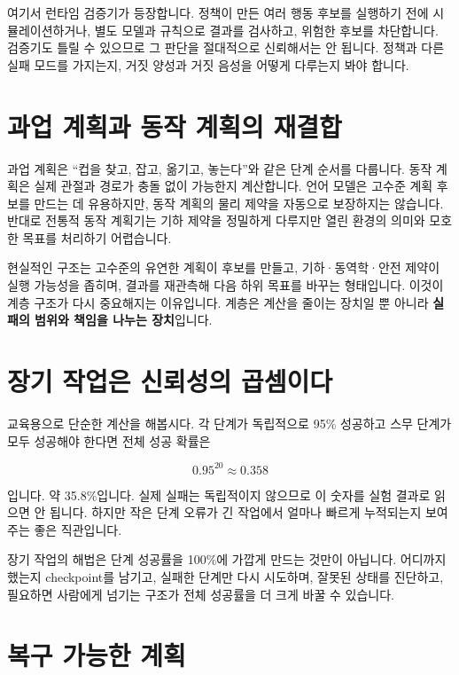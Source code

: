 \documentclass[11pt,openany]{book}
\newcommand{\keyterm}[1]{{\sffamily\bfseries\color{deepblue}#1}}
\begin{document}
여기서 런타임 검증기가 등장합니다. 정책이 만든 여러 행동 후보를 실행하기 전에 시뮬레이션하거나, 별도 모델과 규칙으로 결과를 검사하고, 위험한 후보를 차단합니다. 검증기도 틀릴 수 있으므로 그 판단을 절대적으로 신뢰해서는 안 됩니다. 정책과 다른 실패 모드를 가지는지, 거짓 양성과 거짓 음성을 어떻게 다루는지 봐야 합니다.

\section{과업 계획과 동작 계획의 재결합}

과업 계획은 ``컵을 찾고, 잡고, 옮기고, 놓는다''와 같은 단계 순서를 다룹니다. 동작 계획은 실제 관절과 경로가 충돌 없이 가능한지 계산합니다. 언어 모델은 고수준 계획 후보를 만드는 데 유용하지만, 동작 계획의 물리 제약을 자동으로 보장하지는 않습니다. 반대로 전통적 동작 계획기는 기하 제약을 정밀하게 다루지만 열린 환경의 의미와 모호한 목표를 처리하기 어렵습니다.

현실적인 구조는 고수준의 유연한 계획이 후보를 만들고, 기하·동역학·안전 제약이 실행 가능성을 좁히며, 결과를 재관측해 다음 하위 목표를 바꾸는 형태입니다. 이것이 계층 구조가 다시 중요해지는 이유입니다. 계층은 계산을 줄이는 장치일 뿐 아니라 \keyterm{실패의 범위와 책임을 나누는 장치}입니다.

\section{장기 작업은 신뢰성의 곱셈이다}

교육용으로 단순한 계산을 해봅시다. 각 단계가 독립적으로 95\% 성공하고 스무 단계가 모두 성공해야 한다면 전체 성공 확률은

\[
0.95^{20}\approx 0.358
\]

입니다. 약 35.8\%입니다. 실제 실패는 독립적이지 않으므로 이 숫자를 실험 결과로 읽으면 안 됩니다. 하지만 작은 단계 오류가 긴 작업에서 얼마나 빠르게 누적되는지 보여주는 좋은 직관입니다.

\begin{profbox}
장기 작업의 해법은 단계 성공률을 100\%에 가깝게 만드는 것만이 아닙니다. 어디까지 했는지 checkpoint를 남기고, 실패한 단계만 다시 시도하며, 잘못된 상태를 진단하고, 필요하면 사람에게 넘기는 구조가 전체 성공률을 더 크게 바꿀 수 있습니다.
\end{profbox}

\section{복구 가능한 계획}
\end{document}
